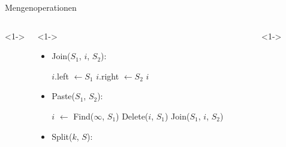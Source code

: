\documentclass[t]{beamer}
\theoremstyle{plain}
\begin{document}
\begin{frame}{Mengenoperationen}
    \begin{columns}<1->
    \begin{column}{.65\textwidth}<1->
        \begin{itemize}
            \item<1> Join($S_1$, $i$, $S_2$):
                \begin{algorithm}[H]
                    $i$.left $\gets S_1$ \;
                    $i$.right $\gets S_2$ \;
                    \Return $i$
                \end{algorithm}
            \item<2> Paste($S_1$, $S_2$):
                \begin{algorithm}[H]
                    $i$ $\gets$ Find($\infty$, $S_1$) 
                    Delete($i$, $S_1$) \;
                    \Return Join($S_1$, $i$, $S_2$) \;
                \end{algorithm}
            \item<3> Split($k$, $S$):
                \begin{algorithm}[H]
                \end{algorithm}
        \end{itemize}
    \end{column}
    \begin{column}{.35\textwidth}<1->
\end{column}
\end{columns}
\end{frame}
\end{document}
